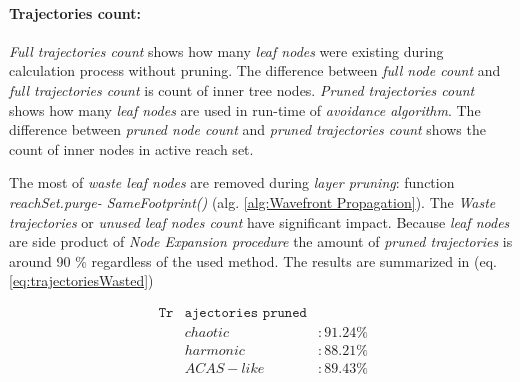 \paragraph{Trajectories count:} \emph{Full trajectories count} shows how many \emph{leaf nodes} were existing during calculation process without pruning. The difference between \emph{full node count} and \emph{full trajectories count} is count of inner tree nodes. 
\emph{Pruned trajectories count} shows how many \emph{leaf nodes} are used in run-time of \emph{avoidance algorithm}. The difference between \emph{pruned node count} and \emph{pruned trajectories count} shows the count of inner nodes in active reach set.

The most of \emph{waste leaf nodes} are removed during \emph{layer pruning}: function \emph{reachSet.purge- SameFootprint()} (alg. \ref{alg:Wavefront Propagation}). The \emph{Waste trajectories} or \emph{unused leaf nodes count} have significant impact. Because \emph{leaf nodes} are side product of \emph{Node Expansion procedure} the amount of  \emph{pruned trajectories} is around 90 $\%$ regardless of the used method. The results are summarized in (eq. \ref{eq:trajectoriesWasted})

\begin{equation}\label{eq:trajectoriesWasted}
    \begin{aligned}
        \texttt{  Tr} & \texttt{ajectories } \texttt{pruned}\\
        &chaotic   &: 91.24 \%\\
        &harmonic  &: 88.21 \%\\
        &ACAS-like &: 89.43 \%
    \end{aligned}
\end{equation}

